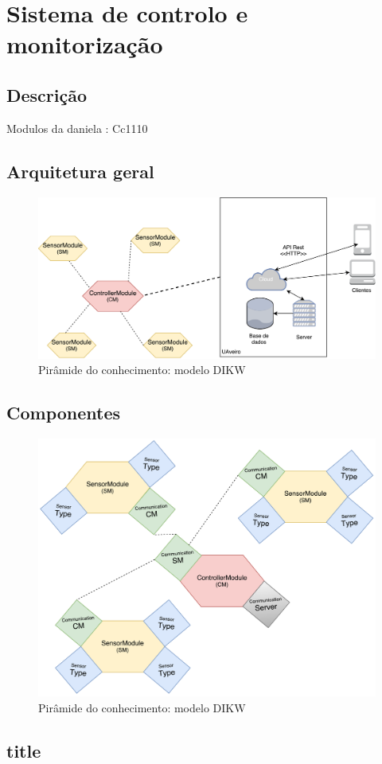 


\chapter{Sistema de controlo e monitorização}

\section{Descrição}


Modulos da daniela : Cc1110



\section{Arquitetura geral}

\begin{figure}[!htb]
	\centering
	\includegraphics[scale=0.55]{esquemas/arquitetura_geral.pdf}
	\caption{Pirâmide do conhecimento: modelo DIKW}
	\label{dikw}
\end{figure}


\newpage


\section{Componentes}


\begin{figure}[!htb]
	\centering
	\includegraphics[scale=0.55]{esquemas/general-electronic-modules.pdf}
	\caption{Pirâmide do conhecimento: modelo DIKW}
	\label{dikw}
\end{figure}


\section{title}